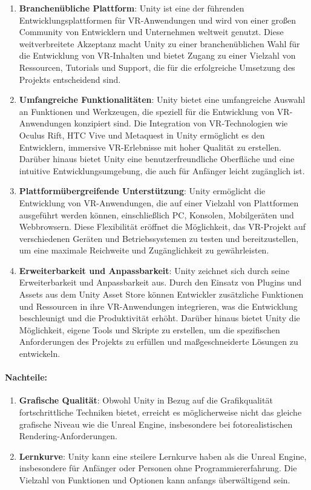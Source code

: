 \begin{enumerate}
\item \textbf{Branchenübliche Plattform}: Unity ist eine der führenden Entwicklungsplattformen für VR-Anwendungen und wird von einer großen Community von Entwicklern und Unternehmen weltweit genutzt. Diese weitverbreitete Akzeptanz macht Unity zu einer branchenüblichen Wahl für die Entwicklung von VR-Inhalten und bietet Zugang zu einer Vielzahl von Ressourcen, Tutorials und Support, die für die erfolgreiche Umsetzung des Projekts entscheidend sind.
\item \textbf{Umfangreiche Funktionalitäten}: Unity bietet eine umfangreiche Auswahl an Funktionen und Werkzeugen, die speziell für die Entwicklung von VR-Anwendungen konzipiert sind. Die Integration von VR-Technologien wie Oculus Rift, HTC Vive und Metaquest in Unity ermöglicht es den Entwicklern, immersive VR-Erlebnisse mit hoher Qualität zu erstellen. Darüber hinaus bietet Unity eine benutzerfreundliche Oberfläche und eine intuitive Entwicklungsumgebung, die auch für Anfänger leicht zugänglich ist.

\item \textbf{Plattformübergreifende Unterstützung}: Unity ermöglicht die Entwicklung von VR-Anwendungen, die auf einer Vielzahl von Plattformen ausgeführt werden können, einschließlich PC, Konsolen, Mobilgeräten und Webbrowsern. Diese Flexibilität eröffnet die Möglichkeit, das VR-Projekt auf verschiedenen Geräten und Betriebssystemen zu testen und bereitzustellen, um eine maximale Reichweite und Zugänglichkeit zu gewährleisten.

\item \textbf{Erweiterbarkeit und Anpassbarkeit}: Unity zeichnet sich durch seine Erweiterbarkeit und Anpassbarkeit aus. Durch den Einsatz von Plugins und Assets aus dem Unity Asset Store können Entwickler zusätzliche Funktionen und Ressourcen in ihre VR-Anwendungen integrieren, was die Entwicklung beschleunigt und die Produktivität erhöht. Darüber hinaus bietet Unity die Möglichkeit, eigene Tools und Skripte zu erstellen, um die spezifischen Anforderungen des Projekts zu erfüllen und maßgeschneiderte Lösungen zu entwickeln.
\end{enumerate}

\paragraph{Nachteile:}

\begin{enumerate}
\item \textbf{Grafische Qualität}: Obwohl Unity in Bezug auf die Grafikqualität fortschrittliche Techniken bietet, erreicht es möglicherweise nicht das gleiche grafische Niveau wie die Unreal Engine, insbesondere bei fotorealistischen Rendering-Anforderungen.
\item \textbf{Lernkurve}: Unity kann eine steilere Lernkurve haben als die Unreal Engine, insbesondere für Anfänger oder Personen ohne Programmiererfahrung. Die Vielzahl von Funktionen und Optionen kann anfangs überwältigend sein.
\end{enumerate}

